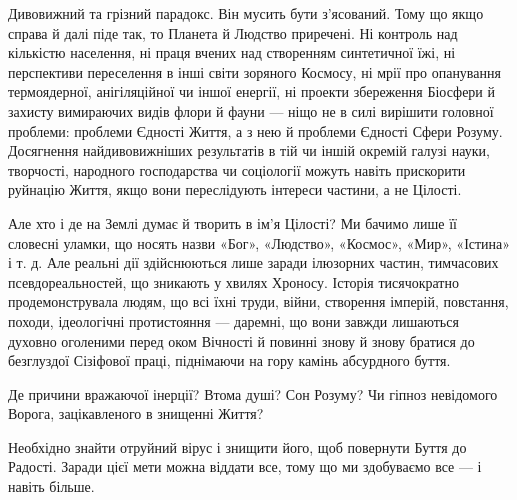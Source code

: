 Дивовижний та грізний парадокс. Він мусить бути з’ясований. Тому що якщо справа
й далі піде так, то Планета й Людство приречені. Ні контроль над кількістю
населення, ні праця вчених над створенням синтетичної їжі, ні перспективи
переселення в інші світи зоряного Космосу, ні мрії про опанування термоядерної,
анігіляційної чи іншої енергії, ні проекти збереження Біосфери й захисту
вимираючих видів флори й фауни — ніщо не в силі вирішити головної проблеми:
проблеми Єдності Життя, а з нею й проблеми Єдності Сфери Розуму. Досягнення
найдивовижніших результатів в тій чи іншій окремій галузі науки, творчості,
народного господарства чи соціології можуть навіть прискорити руйнацію Життя,
якщо вони переслідують інтереси частини, а не Цілості.

Але хто і де на Землі думає й творить в ім’я Цілості? Ми бачимо лише її
словесні уламки, що носять назви «Бог», «Людство», «Космос», «Мир», «Істина» і
т. д. Але реальні дії здійснюються лише заради ілюзорних частин, тимчасових
псевдореальностей, що зникають у хвилях Хроносу. Історія тисячократно
продемонструвала людям, що всі їхні труди, війни, створення імперій, повстання,
походи, ідеологічні протистояння — даремні, що вони завжди лишаються духовно
оголеними перед оком Вічності й повинні знову й знову братися до безглуздої
Сізіфової праці, піднімаючи на гору камінь абсурдного буття.

Де причини вражаючої інерції? Втома душі? Сон Розуму? Чи гіпноз невідомого
Ворога, зацікавленого в знищенні Життя?

Необхідно знайти отруйний вірус і знищити його, щоб повернути Буття до Радості.
Заради цієї мети можна віддати все, тому що ми здобуваємо все — і навіть
більше.
